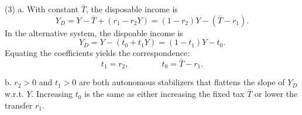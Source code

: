 \documentclass[12pt]{article}
\numberwithin{equation}{section}
\begin{document}
\begin{enumerate}[label=\arabic*.]
    (3) a. With constant $\bar{T}$, the disposable income is
    \[Y_D = Y - \bar{T} + (r_1 - r_2 Y) = (1-r_2)Y - (\bar{T} - r_1).\]
    In the alternative system, the dispoable income is
    \[Y_D = Y - (t_0 + t_1 Y) = (1 - t_1)Y - t_0.\]
    Equating the coefficients yields the correspondence:
    \[t_1 = r_2, \qquad \qquad t_0 = \bar{T} - r_1.\]
    
    b. $r_2>0$ and $t_1>0$ are both autonomous stabilizers that flattens the slope of $Y_D$ w.r.t. $Y$. Increasing $t_0$ is the same as either increasing the fixed tax $\bar{T}$ or lower the transfer $r_1$.
\end{enumerate}
\end{document}
